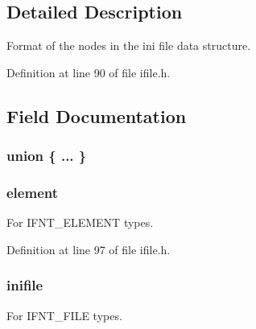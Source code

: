 \subsection{Detailed Description}
Format of the nodes in the ini file data structure. 

Definition at line 90 of file ifile.\-h.



\subsection{Field Documentation}
\hypertarget{struct_i_n_i_f_i_l_e___n_o_d_e_a4be0996d9eb4325528902fc7d49e14bf}{\subsubsection[{"@3}]{\setlength{\rightskip}{0pt plus 5cm}union \{ ... \} }}\label{struct_i_n_i_f_i_l_e___n_o_d_e_a4be0996d9eb4325528902fc7d49e14bf}
\hypertarget{struct_i_n_i_f_i_l_e___n_o_d_e_a84164bc51e06ae830164ae7b047bfad7}{
\subsubsection[{element}]{ element}}\label{struct_i_n_i_f_i_l_e___n_o_d_e_a84164bc51e06ae830164ae7b047bfad7}


For I\-F\-N\-T\-\_\-\-E\-L\-E\-M\-E\-N\-T types. 



Definition at line 97 of file ifile.\-h.

\hypertarget{struct_i_n_i_f_i_l_e___n_o_d_e_a72ba3c5d1252090b306902900075b123}{
\subsubsection[{inifile}]{ inifile}}\label{struct_i_n_i_f_i_l_e___n_o_d_e_a72ba3c5d1252090b306902900075b123}


For I\-F\-N\-T\-\_\-\-F\-I\-L\-E types. 



